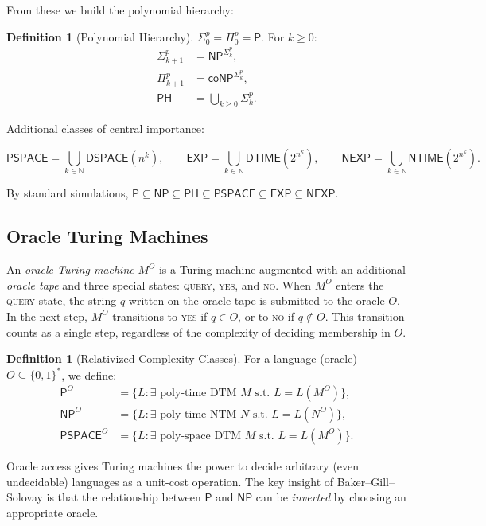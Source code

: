 \documentclass[11pt,a4paper]{article}
\theoremstyle{plain}
\theoremstyle{definition}
\newtheorem{definition}[theorem]{Definition}
\theoremstyle{remark}
\newcommand{\N}{\mathbb{N}}
\newcommand{\PP}{\mathsf{P}}
\newcommand{\NP}{\mathsf{NP}}
\newcommand{\coNP}{\mathsf{coNP}}
\newcommand{\PSPACE}{\mathsf{PSPACE}}
\newcommand{\EXP}{\mathsf{EXP}}
\newcommand{\NEXP}{\mathsf{NEXP}}
\newcommand{\PH}{\mathsf{PH}}
\newcommand{\DTIME}{\mathsf{DTIME}}
\newcommand{\NTIME}{\mathsf{NTIME}}
\newcommand{\DSPACE}{\mathsf{DSPACE}}
\newcommand{\bitsstar}{\{0,1\}^*}
\begin{document}
From these we build the polynomial hierarchy:

\begin{definition}[Polynomial Hierarchy]
$\Sigma_0^p = \Pi_0^p = \PP$.  For $k \geq 0$:
\begin{align*}
    \Sigma_{k+1}^p &= \NP^{\Sigma_k^p}, \\
    \Pi_{k+1}^p   &= \coNP^{\Sigma_k^p}, \\
    \PH           &= \bigcup_{k \geq 0} \Sigma_k^p.
\end{align*}
\end{definition}

Additional classes of central importance:

\[
\PSPACE = \bigcup_{k \in \N} \DSPACE(n^k), \qquad
\EXP   = \bigcup_{k \in \N} \DTIME(2^{n^k}), \qquad
\NEXP  = \bigcup_{k \in \N} \NTIME(2^{n^k}).
\]

By standard simulations, $\PP \subseteq \NP \subseteq \PH \subseteq \PSPACE
\subseteq \EXP \subseteq \NEXP$.

\subsection{Oracle Turing Machines}\label{sec:oracletm}

An \emph{oracle Turing machine} $M^O$ is a Turing machine augmented with an
additional \emph{oracle tape} and three special states: \textsc{query},
\textsc{yes}, and \textsc{no}.  When $M^O$ enters the \textsc{query} state, the
string $q$ written on the oracle tape is submitted to the oracle $O$.  In the
next step, $M^O$ transitions to \textsc{yes} if $q \in O$, or to \textsc{no} if
$q \notin O$.  This transition counts as a single step, regardless of the
complexity of deciding membership in $O$.

\begin{definition}[Relativized Complexity Classes]
For a language (oracle) $O \subseteq \bitsstar$, we define:
\begin{align*}
    \PP^O   &= \{ L : \exists \text{ poly-time DTM } M \text{ s.t. } L = L(M^O) \}, \\
    \NP^O   &= \{ L : \exists \text{ poly-time NTM } N \text{ s.t. } L = L(N^O) \}, \\
    \PSPACE^O &= \{ L : \exists \text{ poly-space DTM } M \text{ s.t. } L = L(M^O) \}.
\end{align*}
\end{definition}

Oracle access gives Turing machines the power to decide arbitrary (even
undecidable) languages as a unit-cost operation.  The key insight of
Baker--Gill--Solovay is that the relationship between $\PP$ and $\NP$ can be
\emph{inverted} by choosing an appropriate oracle.
\end{document}
